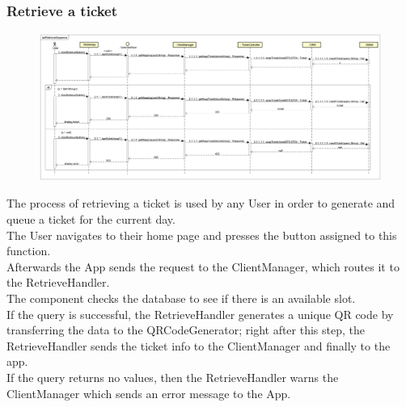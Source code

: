 \documentclass[table, 12pt]{article}
\begin{document}
\subsubsection{Retrieve a ticket}
\begin{figure}[H]
    \begin{center}
        \includegraphics[width=\textwidth]{assets/Sequence-Diagram/RetrieveSequence.png}
    \end{center}
\end{figure}
The process of retrieving a ticket is used by any User in order to generate and queue a ticket for the current day. \\
The User navigates to their home page and presses the button assigned to this function.\\
Afterwards the App sends the request to the ClientManager, which routes it to the RetrieveHandler. \\
The component checks the database to see if there is an available slot.\\
If the query is successful, the RetrieveHandler generates a unique QR code by transferring the data to the QRCodeGenerator; right after this step, the RetrieveHandler sends the ticket info to the ClientManager and finally to the app.\\
If the query returns no values, then the RetrieveHandler warns the ClientManager which sends an error message to the App.
\end{document}
